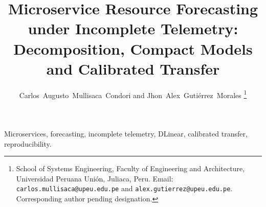 \documentclass[10pt,journal,letterpaper]{IEEEtran}
\title{Microservice Resource Forecasting under Incomplete Telemetry: Decomposition, Compact Models and Calibrated Transfer}
\author{Carlos~Augusto~Mullisaca~Condori and Jhon~Alex~Gutiérrez~Morales%
  \thanks{School of Systems Engineering, Faculty of Engineering and Architecture, Universidad Peruana Unión, Juliaca, Peru. Email: \mbox{\nolinkurl{carlos.mullisaca@upeu.edu.pe}} and \mbox{\nolinkurl{alex.gutierrez@upeu.edu.pe}}. Corresponding author pending designation.}}
\begin{document}
\maketitle
\begin{abstract}

\end{abstract}
\begin{IEEEkeywords}
Microservices, forecasting, incomplete telemetry, DLinear, calibrated transfer, reproducibility.
\end{IEEEkeywords}











\FloatBarrier

\FloatBarrier


\end{document}
